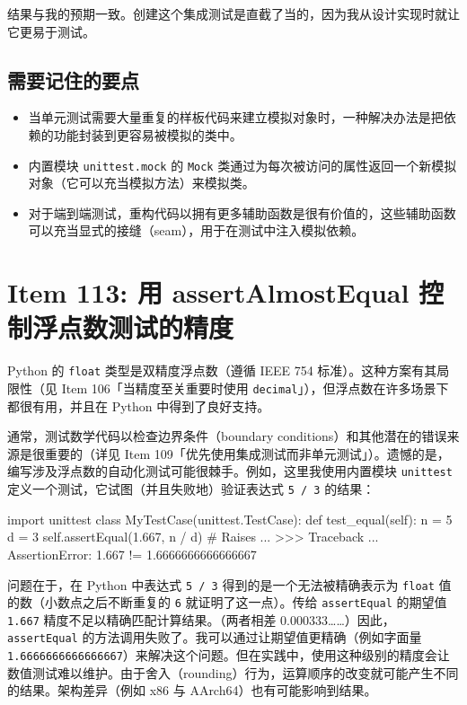 结果与我的预期一致。创建这个集成测试是直截了当的，因为我从设计实现时就让它更易于测试。

\subsection{需要记住的要点}

\begin{itemize}
\item 当单元测试需要大量重复的样板代码来建立模拟对象时，一种解决办法是把依赖的功能封装到更容易被模拟的类中。
\item 内置模块 \texttt{unittest.mock} 的 \texttt{Mock} 类通过为每次被访问的属性返回一个新模拟对象（它可以充当模拟方法）来模拟类。
\item 对于端到端测试，重构代码以拥有更多辅助函数是很有价值的，这些辅助函数可以充当显式的接缝（seam），用于在测试中注入模拟依赖。
\end{itemize}

\section{Item 113: 用 assertAlmostEqual 控制浮点数测试的精度}

Python 的 \texttt{float} 类型是双精度浮点数（遵循 IEEE 754 标准）。这种方案有其局限性（见 Item 106「当精度至关重要时使用 \texttt{decimal}」），但浮点数在许多场景下都很有用，并且在 Python 中得到了良好支持。

通常，测试数学代码以检查边界条件（boundary conditions）和其他潜在的错误来源是很重要的（详见 Item 109「优先使用集成测试而非单元测试」）。遗憾的是，编写涉及浮点数的自动化测试可能很棘手。例如，这里我使用内置模块 \texttt{unittest} 定义一个测试，它试图（并且失败地）验证表达式 \texttt{5 / 3} 的结果：

\begin{codebox}[python]
import unittest
class MyTestCase(unittest.TestCase):
    def test_equal(self):
        n = 5
        d = 3
        self.assertEqual(1.667, n / d)  # Raises
...
>>>
Traceback ...
AssertionError: 1.667 != 1.6666666666666667
\end{codebox}

问题在于，在 Python 中表达式 \texttt{5 / 3} 得到的是一个无法被精确表示为 \texttt{float} 值的数（小数点之后不断重复的 \texttt{6} 就证明了这一点）。传给 \texttt{assertEqual} 的期望值 \texttt{1.667} 精度不足以精确匹配计算结果。（两者相差 0.000333……）因此，\texttt{assertEqual} 的方法调用失败了。我可以通过让期望值更精确（例如字面量 \texttt{1.6666666666666667}）来解决这个问题。但在实践中，使用这种级别的精度会让数值测试难以维护。由于舍入（rounding）行为，运算顺序的改变就可能产生不同的结果。架构差异（例如 x86 与 AArch64）也有可能影响到结果。

